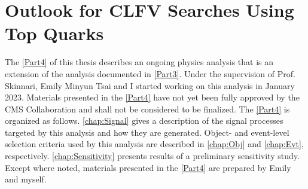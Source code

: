 \part{Outlook for CLFV Searches Using Top Quarks}
\label{Part4}
The \autoref{Part4} of this thesis describes an ongoing physics analysis that is an extension of the analysis documented in \autoref{Part3}. Under the supervision of Prof. Skinnari, Emily Minyun Tsai and I started working on this analysis in January 2023. Materials presented in the \autoref{Part4} have not yet been fully approved by the \ac{CMS} Collaboration and shall not be considered to be finalized. The \autoref{Part4} is organized as follows. \autoref{chap:Signal} gives a description of the signal processes targeted by this analysis and how they are generated. Object- and event-level selection criteria used by this analysis are described in \autoref{chap:Obj} and \autoref{chap:Evt}, respectively. \autoref{chap:Sensitivity} presents results of a preliminary sensitivity study. Except where noted, materials presented in the \autoref{Part4} are prepared by Emily and myself.




